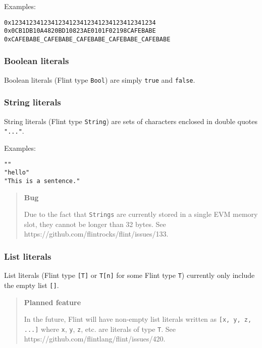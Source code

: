 Examples:

\begin{verbatim}
0x1234123412341234123412341234123412341234
0x0CB1DB10A4820BD10823AE0101F02198CAFEBABE
0xCAFEBABE_CAFEBABE_CAFEBABE_CAFEBABE_CAFEBABE
\end{verbatim}

\subsubsection{Boolean literals}
\label{sec:appendix-b-boolean-literals}

Boolean literals (Flint type \texttt{Bool}) are simply \texttt{true} and \texttt{false}.

\subsubsection{String literals}
\label{sec:appendix-b-string-literals}

String literals (Flint type \texttt{String}) are sets of characters enclosed in double quotes \texttt{"..."}.

Examples:

\begin{verbatim}
""
"hello"
"This is a sentence."
\end{verbatim}

\begin{quote}
\textbf{Bug}

Due to the fact that \texttt{Strings} are currently stored in a single EVM memory slot, they cannot be longer than 32 bytes. See https://github.com/flintrocks/flint/issues/133.
\end{quote}

\subsubsection{List literals}
\label{sec:appendix-b-list-literals}

List literals (Flint type \texttt{[T]} or \texttt{T[n]} for some Flint type \texttt{T}) currently only include the empty list \texttt{[]}.

\begin{quote}
\textbf{Planned feature}

In the future, Flint will have non-empty list literals written as \texttt{[x, y, z, ...]} where \texttt{x}, \texttt{y}, \texttt{z}, etc. are literals of type \texttt{T}. See https://github.com/flintlang/flint/issues/420.
\end{quote}

